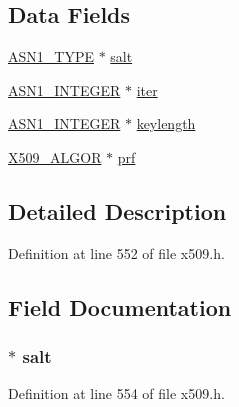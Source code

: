 \subsection*{Data Fields}
\begin{DoxyCompactItemize}
\item 
\hyperlink{crypto_2asn1_2asn1_8h_a7895e03d9fee2bc4963faf2a31a9439e}{A\+S\+N1\+\_\+\+T\+Y\+PE} $\ast$ \hyperlink{struct_p_b_k_d_f2_p_a_r_a_m__st_a4a93ac8b0158a601cb6ecfa4704639e1}{salt}
\item 
\hyperlink{crypto_2ossl__typ_8h_af4335399bf9774cb410a5e93de65998b}{A\+S\+N1\+\_\+\+I\+N\+T\+E\+G\+ER} $\ast$ \hyperlink{struct_p_b_k_d_f2_p_a_r_a_m__st_ab7b90cf95e75c0cd6742cfe1aad7dd03}{iter}
\item 
\hyperlink{crypto_2ossl__typ_8h_af4335399bf9774cb410a5e93de65998b}{A\+S\+N1\+\_\+\+I\+N\+T\+E\+G\+ER} $\ast$ \hyperlink{struct_p_b_k_d_f2_p_a_r_a_m__st_aff4b79f890e22248c3e9ef710be259f1}{keylength}
\item 
\hyperlink{crypto_2ossl__typ_8h_aa2b6185e6254f36f709cd6577fb5022e}{X509\+\_\+\+A\+L\+G\+OR} $\ast$ \hyperlink{struct_p_b_k_d_f2_p_a_r_a_m__st_a4b555f5e1c3039f5bfaa1b3366b45f98}{prf}
\end{DoxyCompactItemize}


\subsection{Detailed Description}


Definition at line 552 of file x509.\+h.



\subsection{Field Documentation}
\subsubsection[{\texorpdfstring{salt}{salt}}]{ $\ast$ salt}\hypertarget{struct_p_b_k_d_f2_p_a_r_a_m__st_a4a93ac8b0158a601cb6ecfa4704639e1}{}\label{struct_p_b_k_d_f2_p_a_r_a_m__st_a4a93ac8b0158a601cb6ecfa4704639e1}


Definition at line 554 of file x509.\+h.

